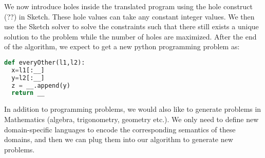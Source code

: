We now introduce holes inside the translated program using the hole construct (??) in Sketch. These hole values can take any constant integer values. We then use the Sketch solver to solve the constraints such that there still exists a unique solution to the problem while the number of holes are maximized. After the end of the algorithm, we expect to get a new python programming problem as:

\singlespace
\begin{lstlisting}[language=Python, frame=single]
def everyOther(l1,l2):
  x=l1[:__]
  y=l2[:__]
  z = __.append(y)
  return __
\end{lstlisting}
\doublespace

In addition to programming problems, we would also like to generate problems in Mathematics (algebra, trigonometry, geometry etc.). We only need to define new domain-specific languages to encode the corresponding semantics of these domains, and then we can plug them into our algorithm to generate new problems.
